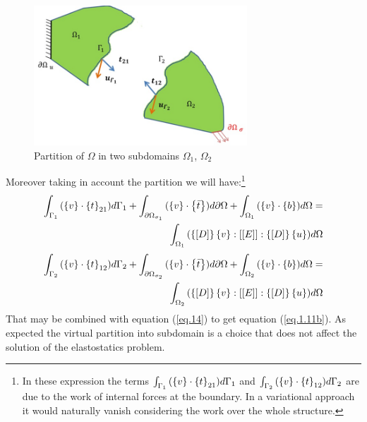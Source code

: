  \begin{figure}[ht]
 \centering
 \includegraphics[width=8cm]{images/Ch1/free_body}
 \caption{Partition of $\Omega$ in two subdomains $\Omega_1$, $\Omega_2$} 
 \label{fig.1.5}
 \end{figure}
 
 Moreover taking in account the partition we will have:\footnote{In these expression the terms $\int_{\Gamma_1}{(\left\lbrace{v}\right \rbrace \cdot \left\lbrace{t}\right \rbrace_{21} )d\Gamma_1}$ and $\int_{\Gamma_2}{(\left\lbrace{v}\right \rbrace \cdot \left\lbrace{t}\right \rbrace_{12} )d\Gamma_2}$ are due to the work of internal forces at the boundary. In a variational approach it would naturally vanish considering the work over the whole structure.}
 \begin{equation}
 \begin{aligned}
 \label{eq.15}
 \int_{\Gamma_1}{(\left\lbrace{v}\right \rbrace \cdot \left\lbrace{t}\right \rbrace_{21} )d\Gamma_1}+\int_{\partial \Omega_{\sigma_1}}{(\left\lbrace{v}\right \rbrace \cdot \left\lbrace{\bar{t}}\right \rbrace )d\partial \Omega}+\int_{\Omega_1}{(\left\lbrace{v}\right \rbrace \cdot \left\lbrace{b}\right \rbrace) d\Omega} =\\\int_{\Omega_1}{(\left\lbrace{\ensuremath\left[{D}\right]}\right \rbrace \left\lbrace{v}\right \rbrace :\left[{\left[{E}\right]}\right]:\left\lbrace{\ensuremath\left[{D}\right]}\right \rbrace \left\lbrace{u}\right \rbrace  )d\Omega}
 \end{aligned}
 \end{equation}
 \begin{equation}
 \begin{split}
 \label{eq.16}
 \int_{\Gamma_2}{(\left\lbrace{v}\right \rbrace \cdot \left\lbrace{t}\right \rbrace_{12} )d\Gamma_2}+\int_{\partial \Omega_{\sigma_2}}{(\left\lbrace{v}\right \rbrace \cdot \left\lbrace{\bar{t}}\right \rbrace )d\partial \Omega}+\int_{ \Omega_2}{(\left\lbrace{v}\right \rbrace \cdot \left\lbrace{b}\right \rbrace) d\Omega}=\\\int_{ \Omega_2}{(\left\lbrace{\ensuremath\left[{D}\right]}\right \rbrace \left\lbrace{v}\right \rbrace :\left[{\left[{E}\right]}\right]:\left\lbrace{\ensuremath\left[{D}\right]}\right \rbrace \left\lbrace{u}\right \rbrace  )d\Omega}
 \end{split}
 \end{equation}
 That may be combined with equation (\ref{eq.14}) to get equation (\ref{eq.1.11b}).
 As expected the virtual partition into subdomain is a choice that does not affect the solution of the elastostatics problem.   
 \\
